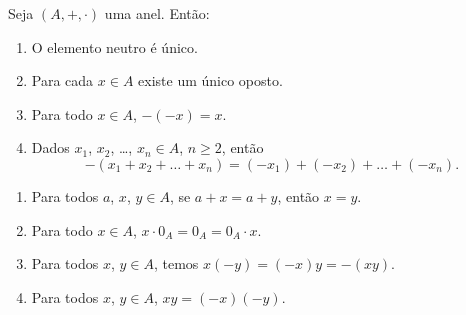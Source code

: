 \documentclass{beamer}
\begin{document}
    \begin{frame}
        \begin{proposicao}
            Seja $(A, + , \cdot)$ uma anel. Ent\~ao:
            \begin{enumerate}[label={\roman*})]
                \item O elemento neutro {\'e} {\'u}nico.

                \vspace{.5cm}

                \item Para cada $x \in A$ existe um {\'u}nico oposto.

                \vspace{.5cm}
                
                \item Para todo $x \in A$, $-(-x) = x$.

                \vspace{.5cm}
                
                \item Dados $x_{1}$, $x_{2}$, \dots, $x_n \in A$, $n \geqslant 2$, ent{\~a}o
                \[
                    -(x_1 + x_2 + \dots + x_n) = (-x_1) + (-x_2) + \dots + (-x_n).
                \]

                \vspace{.5cm}

                \seti
            \end{enumerate}
        \end{proposicao}
    \end{frame}

    \begin{frame}
        \begin{proposicao}
            \begin{enumerate}[label={\roman*})]
                \conti
                
                \item Para todos $a$, $x$, $y \in A$, se $a + x = a + y$, ent{\~a}o $x = y$.

                \vspace{.5cm}
                
                \item Para todo $x \in A$, $x\cdot 0_A = 0_A = 0_A\cdot x$.

                \vspace{.5cm}
                
                \item Para todos $x$, $y \in A$, temos $x(-y) = (-x)y = -(xy)$.

                \vspace{.5cm}
                
                \item Para todos $x$, $y \in A$, $xy = (-x)(-y)$.

                \vspace{.5cm}
            \end{enumerate}
        \end{proposicao}
    \end{frame}
\end{document}
